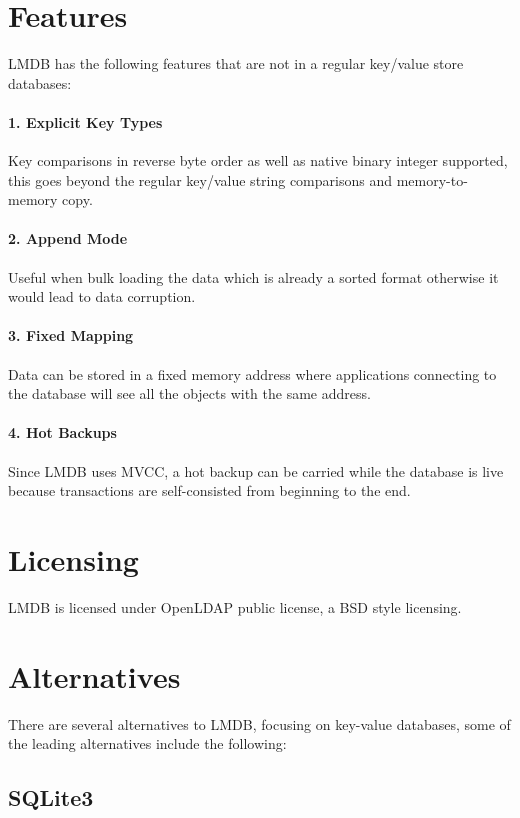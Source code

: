 \documentclass[9pt,twocolumn,twoside]{../../styles/osajnl}
\begin{document}
\section{Features}

LMDB has the following features that are not in a regular key/value
store databases:

\paragraph {1. Explicit Key Types}
Key comparisons in reverse byte order as well as
native binary integer supported, this goes beyond the regular
key/value string comparisons and memory-to-memory copy.

\paragraph {2. Append Mode}
Useful when bulk loading the data which is already a
sorted format otherwise it would lead to data corruption.

\paragraph{3. Fixed Mapping}
Data can be stored in a fixed memory address where
applications connecting to the database will see all the objects with
the same address.

\paragraph{4. Hot Backups}
Since LMDB uses MVCC, a hot backup can be carried while
the database is live because transactions are self-consisted from
beginning to the end.

\section{Licensing}

LMDB is licensed under OpenLDAP public license, a BSD style
licensing.

\section{Alternatives}

There are several alternatives to LMDB, focusing on key-value
databases, some of the leading alternatives include the following:

\subsection{SQLite3}
\end{document}
